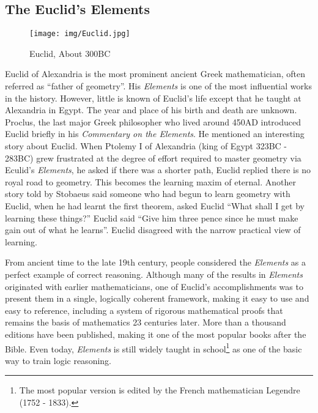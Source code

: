 \documentclass[b5paper]{article}
\begin{document}
\subsection{The Euclid's Elements}

\begin{wrapfigure}{R}{0.35\textwidth}
 \centering
 \texttt{[image: img/Euclid.jpg]}
 \captionsetup{labelformat=empty}
 \caption{Euclid, About 300BC}
 \label{fig:Euclid}
\end{wrapfigure}

Euclid of Alexandria is the most prominent ancient Greek mathematician, often referred as ``father of geometry''. His {\em Elements} is one of the most influential works in the history. However, little is known of Euclid's life except that he taught at Alexandria in Egypt. The year and place of his birth and death are unknown. Proclus, the last major Greek philosopher who lived around 450AD introduced Euclid briefly in his {\em Commentary on the Elements}. He mentioned an interesting story about Euclid. When Ptolemy I of Alexandria (king of Egypt 323BC - 283BC) grew frustrated at the degree of effort required to master geometry via Eculid's {\em Elements}, he asked if there was a shorter path, Euclid replied there is no royal road to geometry. This becomes the learning maxim of eternal. Another story told by Stobaeus said someone who had begun to learn geometry with Euclid, when he had learnt the first theorem, asked Euclid ``What shall I get by learning these things?'' Euclid said ``Give him three pence since he must make gain out of what he learns''. Euclid disagreed with the narrow practical view of learning\cite{Elements}.

From ancient time to the late 19th century, people considered the {\em Elements} as a perfect example of correct reasoning. Although many of the results in {\em Elements} originated with earlier mathematicians, one of Euclid's accomplishments was to present them in a single, logically coherent framework, making it easy to use and easy to reference, including a system of rigorous mathematical proofs that remains the basis of mathematics 23 centuries later. More than a thousand editions have been published, making it one of the most popular books after the Bible. Even today, {\em Elements} is still widely taught in school\footnote{The most popular version is edited by the French mathematician Legendre (1752 - 1833).} as one of the basic way to train logic reasoning\cite{HanXueTao16}.
\end{document}
